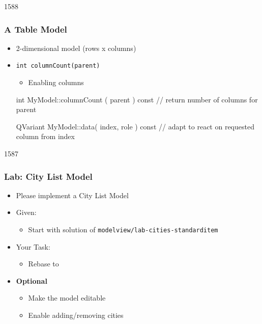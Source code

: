 \begin{slide}[fragile]{1588}\frametitle{A Table Model}
  \begin{itemize}
  \item 2-dimensional model (rows x columns)
  \item \texttt{int columnCount(parent)}
   \begin{itemize}
   \item Enabling columns
   \end{itemize}
    \begin{cpp}
int MyModel::columnCount ( parent ) const {
  // return number of columns for parent
}

QVariant MyModel::data( index, role ) const {
 // adapt to react on requested column from index
}
    \end{cpp}
  \end{itemize}
\end{slide}


\begin{slide}{1587}\frametitle{Lab: City List Model}
  \begin{itemize}
  \item Please implement a City List Model
  \item Given:
    \begin{itemize}
    \item Start with solution of \texttt{modelview/lab-cities-standarditem}
    \end{itemize}
  \item Your Task:
    \begin{itemize}
    \item Rebase  to 
    \end{itemize}
  \item \textbf{Optional}
    \begin{itemize}
    \item Make the model editable
    \item Enable adding/removing cities
   \end{itemize}
 \end{itemize}
 
\end{slide}



